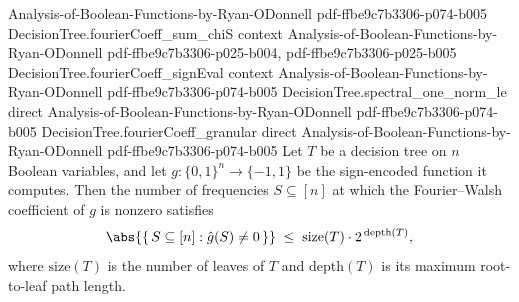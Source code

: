 \begin{theorem}
  {Analysis-of-Boolean-Functions-by-Ryan-ODonnell}
  {pdf-ffbe9c7b3306-p074-b005}
\proofstep
  {DecisionTree.fourierCoeff_sum_chiS}
  {context}
  {Analysis-of-Boolean-Functions-by-Ryan-ODonnell}
  {pdf-ffbe9c7b3306-p025-b004,
    pdf-ffbe9c7b3306-p025-b005}
\proofstep
  {DecisionTree.fourierCoeff_signEval}
  {context}
  {Analysis-of-Boolean-Functions-by-Ryan-ODonnell}
  {pdf-ffbe9c7b3306-p074-b005}
\proofstep
  {DecisionTree.spectral_one_norm_le}
  {direct}
  {Analysis-of-Boolean-Functions-by-Ryan-ODonnell}
  {pdf-ffbe9c7b3306-p074-b005}
\proofstep
  {DecisionTree.fourierCoeff_granular}
  {direct}
  {Analysis-of-Boolean-Functions-by-Ryan-ODonnell}
  {pdf-ffbe9c7b3306-p074-b005}
Let $T$ be a decision tree on $n$ Boolean variables, and let $g \colon \{0,1\}^n \to
\{-1,1\}$ be the sign-encoded function it computes. Then the number of frequencies $S
\subseteq [n]$ at which the Fourier--Walsh coefficient of $g$ is nonzero satisfies
\[
\abs{\{\, S \subseteq [n] : \hat g(S) \neq 0 \,\}} \;\le\; \mathrm{size}(T)\cdot
2^{\,\mathrm{depth}(T)},
\]
where $\mathrm{size}(T)$ is the number of leaves of $T$ and $\mathrm{depth}(T)$ is its
maximum root-to-leaf path length.
\end{theorem}


